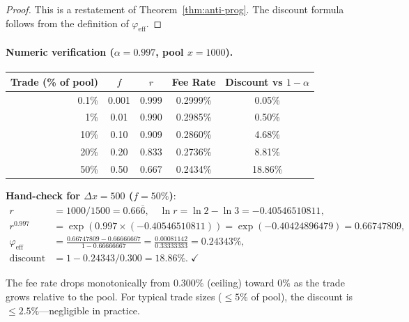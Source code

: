 \documentclass[11pt]{article}
\theoremstyle{definition}
\theoremstyle{remark}
\newcommand{\dx}{\Delta x}
\begin{document}
\begin{proof}
This is a restatement of Theorem~\ref{thm:anti-prog}.
The discount formula follows from the definition of $\varphi_{\mathrm{eff}}$.
\end{proof}

\paragraph{Numeric verification ($\alpha=0.997$, pool $x=1000$).}
\begin{center}
\begin{tabular}{@{}rcccc@{}}
\toprule
\textbf{Trade (\% of pool)} & $f$ & $r$ & \textbf{Fee Rate} & \textbf{Discount vs $1{-}\alpha$} \\
\midrule
0.1\% & 0.001 & 0.999 & 0.2999\% & 0.05\% \\
1\% & 0.01 & 0.990 & 0.2985\% & 0.50\% \\
10\% & 0.10 & 0.909 & 0.2860\% & 4.68\% \\
20\% & 0.20 & 0.833 & 0.2736\% & 8.81\% \\
50\% & 0.50 & 0.667 & 0.2434\% & 18.86\% \\
\bottomrule
\end{tabular}
\end{center}

\noindent
\textbf{Hand-check for $\dx=500$ ($f=50\%$)}:
\begin{align*}
r &= 1000/1500 = 0.66\overline{6},\quad
\ln r = \ln 2 - \ln 3 = -0.40546510811,\\
r^{0.997} &= \exp(0.997\times(-0.40546510811)) = \exp(-0.40424896479) = 0.66747809,\\
\varphi_{\mathrm{eff}} &= \frac{0.66747809-0.66666667}{1-0.66666667} = \frac{0.00081142}{0.33333333} = 0.24343\%,\\
\mathrm{discount} &= 1 - 0.24343/0.300 = 18.86\%.\;\checkmark
\end{align*}

The fee rate drops monotonically from $0.300\%$ (ceiling) toward $0\%$ as the trade grows relative to the pool.
For typical trade sizes (${\le}5\%$ of pool), the discount is ${\le}2.5\%$---negligible in practice.
\end{document}

